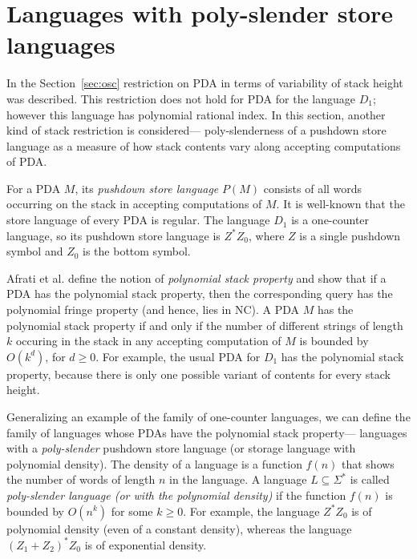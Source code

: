 \section{Languages with poly-slender store languages}
\label{sec:poly}
In the Section~\ref{sec:osc} restriction on PDA in terms of variability of stack height was described. This restriction does not hold for PDA for the language $D_1$; however this language has polynomial rational index. In this section, another kind of stack restriction is considered--- poly-slenderness of a pushdown store language as a measure of how stack contents vary along accepting computations of PDA.


For a PDA $M$, its \textit{pushdown store language} $P(M)$ consists of all words
occurring on the stack in accepting computations of $M$. It is well-known that the store language of every PDA is regular. The language $D_1$ is a one-counter language, so its pushdown store language is $Z^*Z_0$, where $Z$ is a single pushdown symbol and $Z_0$ is the bottom symbol.


Afrati et al. \cite{ChainQ} define the notion of \textit{polynomial stack property} and show that if a PDA has the polynomial stack property, then the corresponding query has the polynomial fringe property (and hence, lies in NC). A PDA $M$ has the polynomial stack property if and only if the number of different strings of length $k$ occuring in the stack in any accepting computation of $M$ is bounded by $O(k^d)$,  for $d \ge 0$. For example, the usual PDA for $D_1$ has the polynomial stack property, because there is only one possible variant of contents for every stack height. 


Generalizing an example of the family of one-counter languages, we can define the family of languages whose PDAs have the polynomial stack property--- languages with a \textit{poly-slender} pushdown store language (or storage language with polynomial density). The density of a language is a function $f(n)$ that shows the number of words of length $n$ in the language. A language $L \subseteq \Sigma^*$ is called \textit{poly-slender language (or with the polynomial density)} if the function $f(n)$ is bounded by $O(n^k)$ for some $k \ge 0$. For example, the language $Z^*Z_0$ is of polynomial density (even of a constant density), whereas the language ${(Z_1 + Z_2)}^*Z_0$ is of exponential density.


